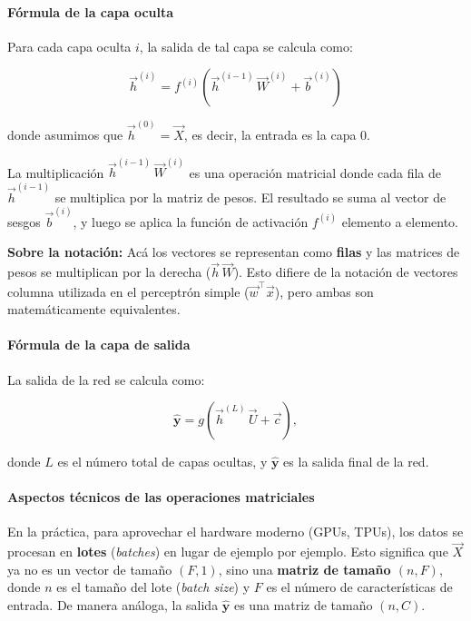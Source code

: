 \paragraph{Fórmula de la capa oculta}

Para cada capa oculta $i$, la salida de tal capa se calcula como:

\begin{equation}
\label{eq:capa-oculta}
\vec{h}^{(i)} = f^{(i)}\!\left( \vec{h}^{(i-1)} \, \vec{W}^{(i)} + \vec{b}^{(i)} \right)
\end{equation}

donde asumimos que $\vec{h}^{(0)} = \vec{X}$, es decir, la entrada es la capa $0$.

La multiplicación $\vec{h}^{(i-1)} \, \vec{W}^{(i)}$ es una operación matricial donde cada fila de $\vec{h}^{(i-1)}$ se multiplica por la matriz de pesos. El resultado se suma al vector de sesgos $\vec{b}^{(i)}$, y luego se aplica la función de activación $f^{(i)}$ elemento a elemento.

\textbf{Sobre la notación:} Acá los vectores se representan como \textbf{filas} y las matrices de pesos se multiplican por la derecha ($\vec{h} \, \vec{W}$). Esto difiere de la notación de vectores columna utilizada en el perceptrón simple ($\vec{w}^\top \vec{x}$), pero ambas son matemáticamente equivalentes.

\paragraph{Fórmula de la capa de salida}

La salida de la red se calcula como:

\begin{equation}
\label{eq:capa-salida}
\hat{\mathbf{y}} = g\!\left( \vec{h}^{(L)} \, \vec{U} + \vec{c} \right),
\end{equation}

donde $L$ es el número total de capas ocultas, y $\hat{\mathbf{y}}$ es la salida final de la red.


\paragraph{Aspectos técnicos de las operaciones matriciales}

En la práctica, para aprovechar el hardware moderno (GPUs, TPUs), los datos se procesan en \textbf{lotes} (\emph{batches}) en lugar de ejemplo por ejemplo. Esto significa que $\vec{X}$ ya no es un vector de tamaño $(F, 1)$, sino una \textbf{matriz de tamaño $(n, F)$}, donde $n$ es el tamaño del lote (\emph{batch size}) y $F$ es el número de características de entrada. De manera análoga, la salida $\hat{\mathbf{y}}$ es una matriz de tamaño $(n, C)$.

